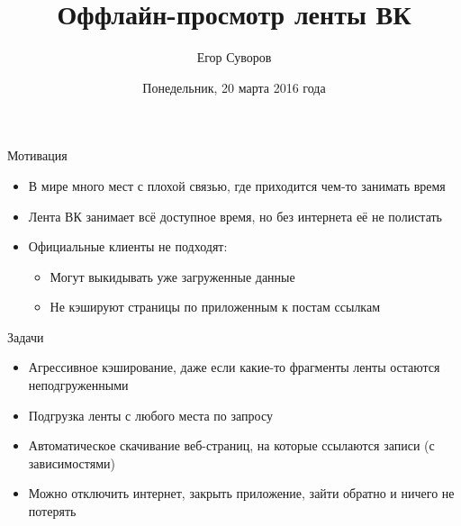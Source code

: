 \documentclass[utf8,xcolor=table]{beamer}
\title{Оффлайн-просмотр ленты ВК}
\author{Егор Суворов}
\institute[СПб АУ]{Практика, осень 2015--зима 2016}
\date[21.03.2016]{Понедельник, 20 марта 2016 года}
\begin{document}
\begin{frame}
\titlepage
\end{frame}

\begin{frame}[t]{Мотивация}
	\begin{itemize}
		\item В мире много мест с плохой связью, где приходится чем-то занимать время
		\item Лента ВК занимает всё доступное время, но без интернета её не полистать
		\item Официальные клиенты не подходят:
			\begin{itemize}
				\item Могут выкидывать уже загруженные данные
				\item Не кэшируют страницы по приложенным к постам ссылкам
			\end{itemize}
	\end{itemize}
\end{frame}

\begin{frame}[t]{Задачи}
	\begin{itemize}
		\item Агрессивное кэширование, даже если какие-то фрагменты ленты остаются неподгруженными
		\item Подгрузка ленты с любого места по запросу
		\item Автоматическое скачивание веб-страниц, на которые ссылаются записи (с зависимостями)
		\item Можно отключить интернет, закрыть приложение, зайти обратно и ничего не потерять
	\end{itemize}
\end{frame}
\end{document}
